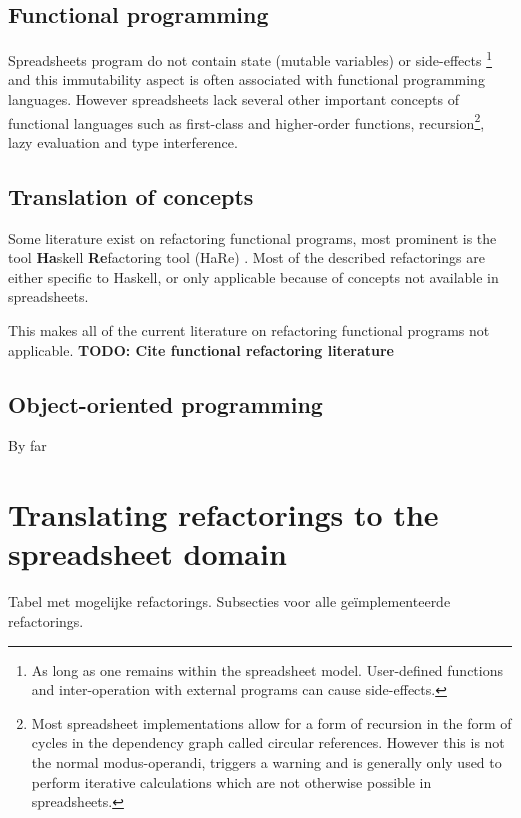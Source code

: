 \documentclass[12pt,a4paper,onecolumn,oneside]{memoir}
\newcommand{\todo}[1]{\textbf{TODO: #1}}
\begin{document}
\subsection{Functional programming}
Spreadsheets program do not contain state (mutable variables) or side-effects
\footnote{As long as one remains within the spreadsheet model. User-defined functions and inter-operation with external programs can cause side-effects.}
and this immutability aspect is often associated with functional programming languages.
However spreadsheets lack several other important concepts of functional languages such as first-class and higher-order functions, recursion\footnote{Most spreadsheet implementations allow for a form of recursion in the form of cycles in the dependency graph called circular references. However this is not the normal modus-operandi, triggers a warning and is generally only used to perform iterative calculations which are not otherwise possible in spreadsheets.}, lazy evaluation and type interference.

\subsection{Translation of concepts}

Some literature exist on refactoring functional programs, most prominent is the tool \textbf{Ha}skell \textbf{Re}factoring tool (HaRe) \cite{thompson2005refactoring}.
Most of the described refactorings are either specific to Haskell, or only applicable because of concepts not available in spreadsheets.

This makes all of the current literature on refactoring functional programs not applicable.
\todo{Cite functional refactoring literature}

\subsection{Object-oriented programming}

By far 



\section{Translating refactorings to the spreadsheet domain}

Tabel met mogelijke refactorings.
Subsecties voor alle geïmplementeerde refactorings.


\end{document}
